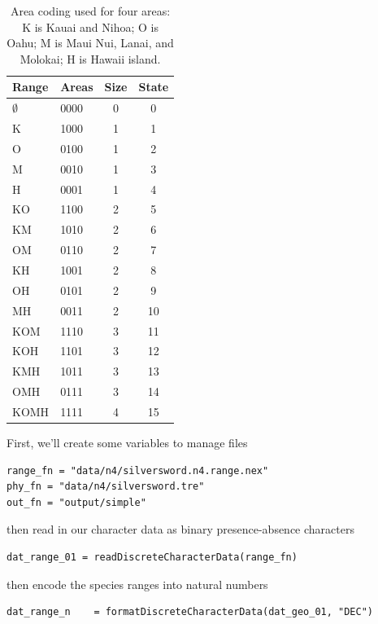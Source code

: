 \begin{table}[!ht]
\centering
\begin{tabular}{llcc}
Range & Areas & Size & State \\ \hline
$\emptyset$ & 0000 & 0 & 0 \\
K    & 1000 & 1 & 1 \\
O    & 0100 & 1 & 2 \\
M    & 0010 & 1 & 3 \\
H    & 0001 & 1 & 4 \\
KO   & 1100 & 2 & 5 \\
KM   & 1010 & 2 & 6 \\
OM   & 0110 & 2 & 7 \\
KH   & 1001 & 2 & 8 \\
OH   & 0101 & 2 & 9 \\
MH   & 0011 & 2 & 10 \\
KOM  & 1110 & 3 & 11 \\ 
KOH  & 1101 & 3 & 12 \\
KMH  & 1011 & 3 & 13 \\
OMH  & 0111 & 3 & 14 \\
KOMH & 1111 & 4 & 15 \\
\end{tabular}
\caption{Area coding used for four areas: K is Kauai and Nihoa; O is Oahu; M is Maui Nui, Lanai, and Molokai; H is Hawaii island.}
\end{table}


First, we'll create some variables to manage files

{\tt \begin{snugshade*}
\begin{lstlisting}
range_fn = "data/n4/silversword.n4.range.nex"
phy_fn = "data/n4/silversword.tre"
out_fn = "output/simple"
\end{lstlisting}
\end{snugshade*} }

then read in our character data as binary presence-absence characters

\begin{snugshade}
\begin{lstlisting}
dat_range_01 = readDiscreteCharacterData(range_fn)
\end{lstlisting}
\end{snugshade}

then encode the species ranges into natural numbers

\begin{snugshade}
\begin{lstlisting}
dat_range_n    = formatDiscreteCharacterData(dat_geo_01, "DEC")
\end{lstlisting}
\end{snugshade}


